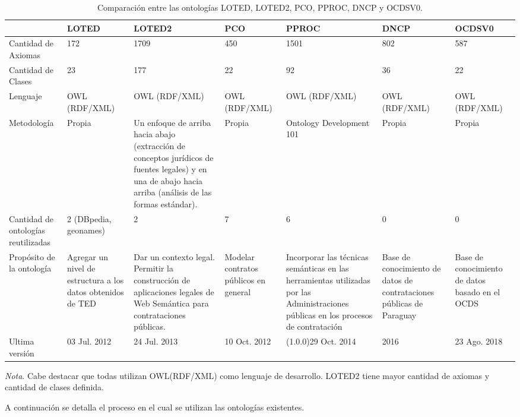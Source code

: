 \begin{table}[!htb]
    \caption{Comparación entre las ontologías LOTED, LOTED2, PCO, PPROC, DNCP y OCDSV0.}
    \label{tab:comparacion_ontologias}
    
    \scriptsize 
    \begin{tabular}{|L{1.5cm}|C{1.8cm}|C{2cm}|C{1.8cm}|C{1.8cm}|C{1.8cm}|C{1.8cm}|}
    \hline
     & LOTED & LOTED2 & PCO & PPROC & DNCP  & OCDSV0 \\
    \hline

    
    Cantidad de Axiomas & 172 & 1709 & 450 & 1501 & 802 & 587\\
    \hline

    Cantidad de Clases & 23 & 177 & 22 & 92 & 36 & 22\\
    \hline

    Lenguaje & OWL (RDF/XML) & OWL (RDF/XML) & OWL (RDF/XML) & OWL (RDF/XML) & OWL (RDF/XML)& OWL (RDF/XML)\\
    \hline
    Metodología & Propia & 
    Un enfoque de arriba hacia abajo (extracción de conceptos jurídicos de fuentes legales) y en una de abajo hacia arriba (análisis de las formas estándar).
     & Propia & Ontology Development 101 & Propia & Propia\\
     \hline
    Cantidad de ontologías reutilizadas & 2 (DBpedia, geonames) & 2 & 7 & 6 & 0  & 0\\
    \hline
    Propósito de la ontología & Agregar un nivel de estructura a los datos obtenidos de TED & Dar un contexto legal. Permitir la construcción de aplicaciones legales de Web Semántica para contrataciones públicas. & Modelar contratos públicos en general & Incorporar las técnicas
    semánticas en las herramientas utilizadas por las Administraciones públicas en los procesos de contratación & Base de conocimiento de datos de contrataciones públicas de Paraguay & Base de conocimiento de datos basado en el OCDS \\
    \hline
    Ultima versión & 03 Jul. 2012 & 24 Jul. 2013 & 10 Oct. 2012 & (1.0.0)29 Oct. 2014 & 2016 & 23 Ago. 2018\\
    \hline
    \end{tabular}
    
    \bigskip
    \small\textit{Nota}. Cabe destacar que todas utilizan OWL(RDF/XML) como lenguaje de desarrollo. LOTED2 tiene mayor cantidad de axiomas y cantidad de clases definida.
    \end{table}

    A continuación se detalla el proceso en el cual se utilizan las ontologías existentes.

